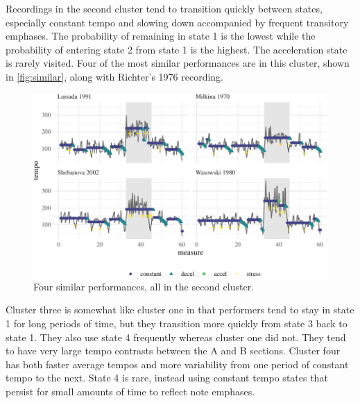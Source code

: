 \documentclass[aoas]{imsart}
\begin{document}
Recordings in the second
cluster tend to transition quickly between states, especially constant
tempo and slowing down accompanied by frequent transitory
emphases. The probability of remaining in state 1 is the lowest while
the probability of entering state 2 from state 1 is 
the highest. The acceleration state is rarely visited. Four of
the most similar performances are in this cluster, shown in
\autoref{fig:similar}, along with Richter's 1976 recording.
\begin{figure}[t]
  \centering
  \includegraphics[width=.9\linewidth]{similar-perfs-1}
  \caption{Four similar performances, all in the second cluster.}
  \label{fig:similar}
\end{figure}

Cluster three is somewhat like cluster one in that performers tend to
stay in state 1 for long periods of time, but they transition more
quickly from state 3 back to state 1. They also use state 4 frequently
whereas cluster one
did not. They tend to have very large tempo
contrasts between the A and B sections.
Cluster four has both faster average tempos and more variability from one period of
constant tempo to the next. State 4 is rare, instead using constant tempo 
states that persist for small amounts of time to reflect note
emphases.
\end{document}
